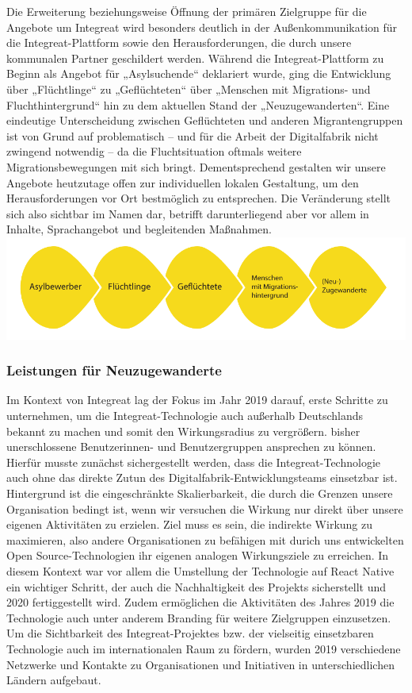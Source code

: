 \documentclass[12pt, a4paper]{article} %
\begin{document}
Die Erweiterung beziehungsweise Öffnung der primären Zielgruppe für die
Angebote um Integreat wird besonders deutlich in der Außenkommunikation
für die Integreat-Plattform sowie den Herausforderungen, die durch
unsere kommunalen Partner geschildert werden. Während die
Integreat-Plattform zu Beginn als Angebot für „Asylsuchende“ deklariert
wurde, ging die Entwicklung über „Flüchtlinge“ zu „Geflüchteten“ über
„Menschen mit Migrations- und Fluchthintergrund“ hin zu dem aktuellen
Stand der „Neuzugewanderten“. Eine eindeutige Unterscheidung zwischen
Geflüchteten und anderen Migrantengruppen ist von Grund auf
problematisch – und für die Arbeit der Digitalfabrik nicht zwingend
notwendig – da die Fluchtsituation oftmals weitere Migrationsbewegungen
mit sich bringt. Dementsprechend gestalten wir unsere Angebote
heutzutage offen zur individuellen lokalen Gestaltung, um den
Herausforderungen vor Ort bestmöglich zu entsprechen. Die Veränderung
stellt sich also sichtbar im Namen dar, betrifft darunterliegend aber
vor allem in Inhalte, Sprachangebot und begleitenden Maßnahmen.
\includegraphics[width=\textwidth]{figure/Flowchart.pdf}

\hypertarget{leistungen-fuxfcr-neuzugewanderte}{%
\subsubsection{Leistungen für
Neuzugewanderte}\label{leistungen-fuxfcr-neuzugewanderte}}

Im Kontext von Integreat lag der Fokus im Jahr 2019 darauf, erste
Schritte zu unternehmen, um die Integreat-Technologie auch außerhalb
Deutschlands bekannt zu machen und somit den Wirkungsradius zu
vergrößern. bisher unerschlossene Benutzerinnen- und Benutzergruppen
ansprechen zu können. Hierfür musste zunächst sichergestellt werden,
dass die Integreat-Technologie auch ohne das direkte Zutun des
Digitalfabrik-Entwicklungsteams einsetzbar ist. Hintergrund ist die
eingeschränkte Skalierbarkeit, die durch die Grenzen unsere Organisation
bedingt ist, wenn wir versuchen die Wirkung nur direkt über unsere
eigenen Aktivitäten zu erzielen. Ziel muss es sein, die indirekte
Wirkung zu maximieren, also andere Organisationen zu befähigen mit
durich uns entwickelten Open Source-Technologien ihr eigenen analogen
Wirkungsziele zu erreichen. In diesem Kontext war vor allem die
Umstellung der Technologie auf React Native ein wichtiger Schritt, der
auch die Nachhaltigkeit des Projekts sicherstellt und 2020
fertiggestellt wird. Zudem ermöglichen die Aktivitäten des Jahres 2019
die Technologie auch unter anderem Branding für weitere Zielgruppen
einzusetzen. Um die Sichtbarkeit des Integreat-Projektes bzw. der
vielseitig einsetzbaren Technologie auch im internationalen Raum zu
fördern, wurden 2019 verschiedene Netzwerke und Kontakte zu
Organisationen und Initiativen in unterschiedlichen Ländern aufgebaut.
\end{document}
